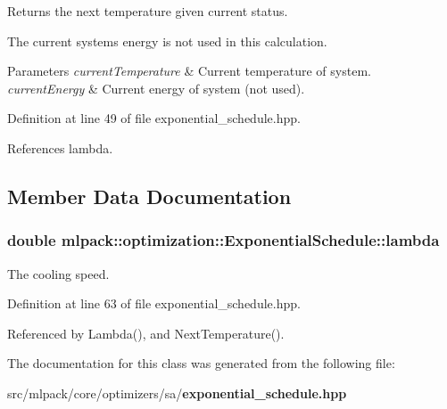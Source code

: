 Returns the next temperature given current status. 

The current system\textquotesingle{}s energy is not used in this calculation.


\begin{DoxyParams}{Parameters}
{\em current\+Temperature} & Current temperature of system. \\
\hline
{\em current\+Energy} & Current energy of system (not used). \\
\hline
\end{DoxyParams}


Definition at line 49 of file exponential\+\_\+schedule.\+hpp.



References lambda.



\subsection{Member Data Documentation}
\subsubsection[{lambda}]{\setlength{\rightskip}{0pt plus 5cm}double mlpack\+::optimization\+::\+Exponential\+Schedule\+::lambda\hspace{0.3cm}{\ttfamily [private]}}\label{classmlpack_1_1optimization_1_1ExponentialSchedule_adc7beb2e3179c579f16c5eddcaf80291}


The cooling speed. 



Definition at line 63 of file exponential\+\_\+schedule.\+hpp.



Referenced by Lambda(), and Next\+Temperature().



The documentation for this class was generated from the following file\+:\begin{DoxyCompactItemize}
\item 
src/mlpack/core/optimizers/sa/{\bf exponential\+\_\+schedule.\+hpp}\end{DoxyCompactItemize}
